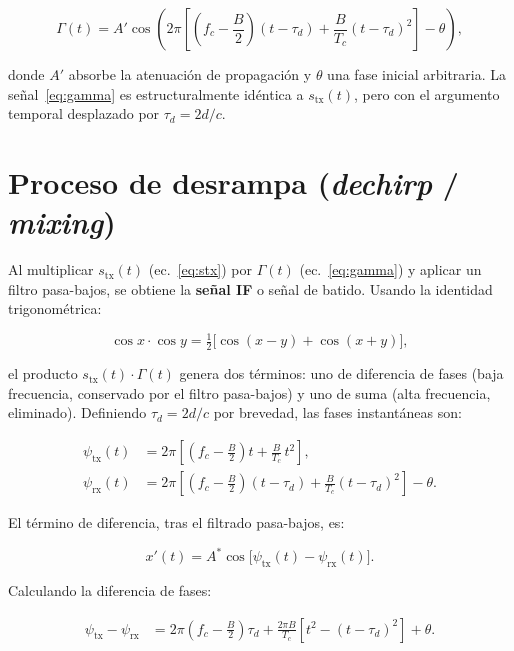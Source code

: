 \documentclass[12pt, a4paper, twoside]{report}
\begin{document}
\begin{equation}
  \Gamma(t) = A' \cos\!\left(
    2\pi\left[\left(f_c - \frac{B}{2}\right)(t-\tau_d)
    + \frac{B}{T_c}(t-\tau_d)^2\right] - \theta
  \right),
  \label{eq:gamma}
\end{equation}

donde $A'$ absorbe la atenuación de propagación y $\theta$ una fase
inicial arbitraria. La señal~\eqref{eq:gamma} es estructuralmente
idéntica a $s_\text{tx}(t)$, pero con el argumento temporal
desplazado por $\tau_d = 2d/c$.

\section{Proceso de desrampa (\textit{dechirp} / \textit{mixing})}
\label{sec:mixing}

Al multiplicar $s_\text{tx}(t)$ (ec.~\eqref{eq:stx}) por $\Gamma(t)$
(ec.~\eqref{eq:gamma}) y aplicar un filtro pasa-bajos, se obtiene la
\textbf{señal IF} o señal de batido. Usando la identidad trigonométrica:

\begin{equation}
  \cos x \cdot \cos y = \tfrac{1}{2}\bigl[\cos(x - y) + \cos(x + y)\bigr],
\end{equation}

el producto $s_\text{tx}(t)\cdot\Gamma(t)$ genera dos términos: uno de
diferencia de fases (baja frecuencia, conservado por el filtro
pasa-bajos) y uno de suma (alta frecuencia, eliminado). Definiendo
$\tau_d = 2d/c$ por brevedad, las fases instantáneas son:

\begin{align}
  \psi_\text{tx}(t) &= 2\pi\left[\left(f_c-\tfrac{B}{2}\right)t
  + \tfrac{B}{T_c}\,t^2\right], \\
  \psi_\text{rx}(t) &= 2\pi\left[\left(f_c-\tfrac{B}{2}\right)(t-\tau_d)
  + \tfrac{B}{T_c}(t-\tau_d)^2\right] - \theta.
\end{align}

El término de diferencia, tras el filtrado pasa-bajos, es:

\begin{equation}
  x'(t) = A^*\cos\!\bigl[\psi_\text{tx}(t) - \psi_\text{rx}(t)\bigr].
\end{equation}

Calculando la diferencia de fases:

\begin{align}
  \psi_\text{tx} - \psi_\text{rx}
  &= 2\pi\left(f_c - \frac{B}{2}\right)\tau_d
  + \frac{2\pi B}{T_c}\!\left[t^2 - (t-\tau_d)^2\right] + \theta.
\end{align}
\end{document}
